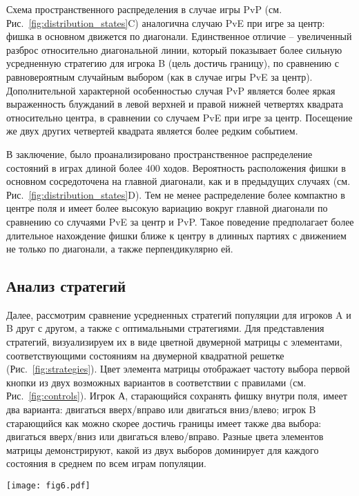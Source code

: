 Схема пространственного распределения в случае игры PvP (см. Рис.~\cref{fig:distribution_states}C) аналогична случаю PvE при игре за центр: фишка в основном движется по диагонали. Единственное отличие -- увеличенный разброс относительно диагональной линии, который показывает более сильную усредненную стратегию для игрока B (цель достичь границу), по сравнению с равновероятным случайным выбором (как в случае игры PvE за центр). Дополнительной характерной особенностью случая PvP является более яркая выраженность блужданий в левой верхней и правой нижней четвертях квадрата относительно центра, в сравнении со случаем PvE при игре за центр. Посещение же двух других четвертей квадрата является более редким событием.

В заключение, было проанализировано пространственное распределение состояний в играх длиной более $400$ ходов. Вероятность расположения фишки в основном сосредоточена на главной диагонали, как и в предыдущих случаях (см. Рис.~\cref{fig:distribution_states}D). Тем не менее распределение более компактно в центре поля и имеет более высокую вариацию вокруг главной диагонали по сравнению со случаями PvE за центр и PvP. Такое поведение предполагает более длительное нахождение фишки ближе к центру в длинных партиях с движением не только по диагонали, а также перпендикулярно ей.

\subsection{Анализ стратегий}\label{subsec:ch3/sec4/sub5}

Далее, рассмотрим сравнение усредненных стратегий популяции для игроков A и B друг с другом, а также с оптимальными стратегиями. Для представления стратегий, визуализируем их в виде цветной двумерной матрицы с элементами, соответствующими состояниям на двумерной квадратной решетке (Рис.~\cref{fig:strategies}). Цвет элемента матрицы отображает частоту выбора первой кнопки из двух возможных вариантов в соответствии с правилами (см. Рис.~\cref{fig:controls}). Игрок А, старающийся сохранять фишку внутри поля, имеет два варианта: двигаться вверх/вправо или двигаться вниз/влево; игрок B старающийся как можно скорее достичь границы имеет также два выбора: двигаться вверх/вниз или двигаться влево/вправо. Разные цвета элементов матрицы демонстрируют, какой из двух выборов доминирует для каждого состояния в среднем по всем играм популяции.

\begin{figure*}[t]
    \centering
    \texttt{[image: fig6.pdf]}
    \caption{
        Визуализация средних популяционных стратегий для разных режимов, полученных в эксперименте. Цвет ячеек отображает частоту выбора первой чистой стратегии: для игры за центр (A, B, C) и для игры за границу (D, E, F).
    }  
    \label{fig:strategies}
    
\end{figure*}

